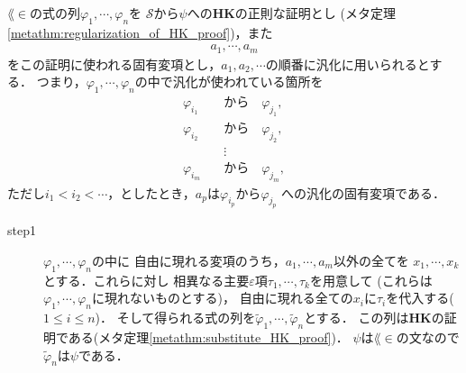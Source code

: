 	\begin{metaprf}
		$\lang{\in}$の式の列$\varphi_{1},\cdots,\varphi_{n}$を
		$\mathscr{S}$から$\psi$への{\bf HK}の正則な証明とし
		(メタ定理\ref{metathm:regularization_of_HK_proof})，また
		\begin{align}
			a_{1},\cdots,a_{m}
		\end{align}
		をこの証明に使われる固有変項とし，$a_{1},a_{2},\cdots$の順番に汎化に用いられるとする．
		つまり，$\varphi_{1},\cdots,\varphi_{n}$の中で汎化が使われている箇所を
		\begin{align}
			\varphi_{i_{1}} \quad &\mbox{から} \quad \varphi_{j_{1}}, \\
			\varphi_{i_{2}} \quad &\mbox{から} \quad \varphi_{j_{2}}, \\
			&\vdots \\
			\varphi_{i_{m}} \quad &\mbox{から} \quad \varphi_{j_{m}},
		\end{align}
		ただし$i_{1}<i_{2}<\cdots$，としたとき，$a_{p}$は$\varphi_{i_{p}}$から$\varphi_{j_{p}}$
		への汎化の固有変項である．
	
		\begin{description}
			\item[step1]
				$\varphi_{1},\cdots,\varphi_{n}$の中に
				自由に現れる変項のうち，$a_{1},\cdots,a_{m}$以外の全てを
				$x_{1},\cdots,x_{k}$とする．これらに対し
				相異なる主要$\varepsilon$項$\tau_{1},\cdots,\tau_{k}$を用意して
				(これらは$\varphi_{1},\cdots,\varphi_{n}$に現れないものとする)，
				自由に現れる全ての$x_{i}$に$\tau_{i}$を代入する($1 \leq i \leq n$)．
				そして得られる式の列を$\widetilde{\varphi}_{1},\cdots,\widetilde{\varphi}_{n}$とする．
				この列は{\bf HK}の証明である(メタ定理\ref{metathm:substitute_HK_proof})．
				$\psi$は$\lang{\in}$の文なので$\widetilde{\varphi}_{n}$は$\psi$である．
				

\end{description}
\end{metaprf}
